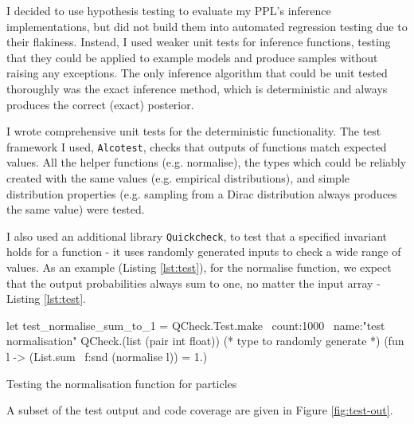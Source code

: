 I decided to use hypothesis testing to evaluate my PPL's inference implementations, but did not build them into automated regression testing due to their flakiness. Instead, I used weaker unit tests for inference functions, testing that they could be applied to example models and produce samples without raising any exceptions. The only inference algorithm that could be unit tested thoroughly was the exact inference method, which is deterministic and always produces the correct (exact) posterior.
			
I wrote comprehensive unit tests for the deterministic functionality. The test framework I used, \texttt{Alcotest}, checks that outputs of functions match expected values. All the helper functions (e.g. normalise), the types which could be reliably created with the same values (e.g. empirical distributions), and simple distribution properties (e.g. sampling from a Dirac distribution always produces the same value) were tested.
			
I also used an additional library \texttt{Quickcheck}, to test that a specified invariant holds for a function - it uses randomly generated inputs to check a wide range of values. As an example (Listing \ref{lst:test}), for the normalise function, we expect that the output probabilities always sum to one, no matter the input array - Listing \ref{lst:test}.
				
			\begin{listing}[!htb]
				\centering
				\begin{ocamlcode-in} 
					let test_normalise_sum_to_1 =
					QCheck.Test.make ~count:1000 ~name:"test normalisation"
					QCheck.(list (pair int float)) (* type to randomly generate *)
					(fun l -> (List.sum ~f:snd (normalise l)) = 1.)
				\end{ocamlcode-in}
				\caption{Testing the normalisation function for particles}
				\label{lst:test}
			\end{listing}
				
A subset of the test output and code coverage are given in Figure \ref{fig:test-out}.
			
